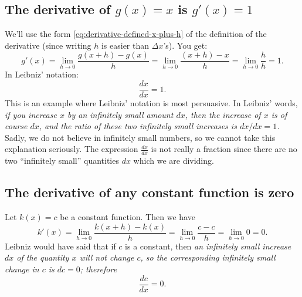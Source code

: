 \subsection{The derivative of $g(x) = x$ is $g'(x) =1$}
\label{ex:derivative-of-a-constant}
We'll use the form \eqref{eq:derivative-defined-x-plus-h} of the
definition of the derivative (since writing $h$ is easier than
$\Delta x$'s).  You get:
\[
g'(x)= \lim_{h\to 0} \frac{g(x+h)-g(x)}{h}
= \lim_{h\to 0} \frac{(x+h) -x}{h}=\lim_{h\to 0} \frac{h}{h} =1.
\]
In Leibniz' notation:
\[
\frac{dx}{dx} = 1.
\]
This is an example where Leibniz' notation is most persuasive.  In
Leibniz' words, \textit{if you increase $x$ by an infinitely small
  amount $dx$, then the increase of $x$ is of course $dx$, and the
  ratio of these two infinitely small increases is $dx/dx = 1$.}
Sadly, we do not believe in infinitely small numbers, so we cannot
take this explanation seriously.  The expression $\frac{dx}{dx}$ is
not really a fraction since there are no two ``infinitely small''
quantities $dx$ which we are dividing.

\subsection{The derivative of any constant function is zero}
Let $k(x)=c$ be a constant function.  Then we have
\[
k'(x)= \lim_{h\to 0} \frac{k(x+h)-k(x)}{h}
= \lim_{h\to 0} \frac{c-c}{h}=\lim_{h\to 0} 0 =0.
\]
Leibniz would have said that if $c$ is a constant, then \textit{an
  infinitely small increase $dx$ of the quantity $x$ will not change
  $c$, so the corresponding infinitely small change in $c$ is $dc=0$;
  therefore}
\[
\frac{dc}{dx} = 0.
\]

